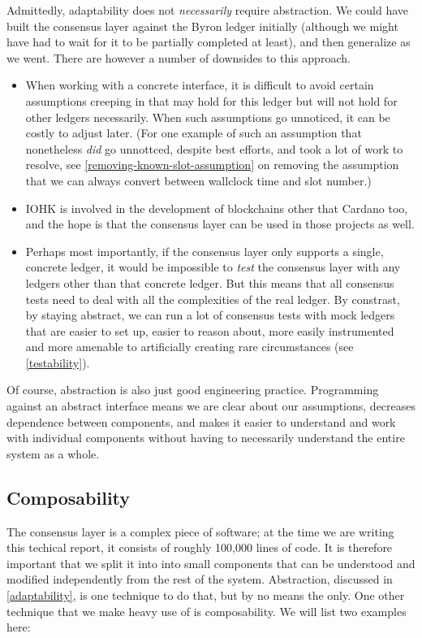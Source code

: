 Admittedly, adaptability does not \emph{necessarily} require abstraction. We
could have built the consensus layer against the Byron ledger initially
(although we might have had to wait for it to be partially completed at least),
and then generalize as we went. There are however a number of downsides to this
approach.

\begin{itemize}
\item When working with a concrete interface, it is difficult to avoid certain
assumptions creeping in that may hold for this ledger but will not hold for
other ledgers necessarily. When such assumptions go unnoticed, it can be costly
to adjust later. (For one example of such an assumption that nonetheless
\emph{did} go unnottced, despite best efforts, and took a lot of work to
resolve, see \cref{removing-known-slot-assumption} on removing the assumption
that we can always convert between wallclock time and slot number.)

\item IOHK is involved in the development of blockchains other that Cardano too,
and the hope is that the consensus layer can be used in those projects as well.

\item Perhaps most importantly, if the consensus layer only supports a single,
concrete ledger, it would be impossible to \emph{test} the consensus layer with
any ledgers other than that concrete ledger. But this means that all consensus
tests need to deal with all the complexities of the real ledger. By constrast,
by staying abstract, we can run a lot of consensus tests with mock ledgers that
are easier to set up, easier to reason about, more easily instrumented and more
amenable to artificially creating rare circumstances (see \cref{testability}).
\end{itemize}

Of course, abstraction is also just good engineering practice. Programming
against an abstract interface means we are clear about our assumptions,
decreases dependence between components, and makes it easier to understand and
work with individual components without having to necessarily understand the
entire system as a whole.

\subsection{Composability}
\label{composability}

The consensus layer is a complex piece of software;  at the time we are writing
this techical report, it consists of roughly 100,000 lines of code. It is
therefore important that we split it into into small components that can be
understood and modified independently from the rest of the system. Abstraction,
discussed in \cref{adaptability}, is one technique to do that, but by no means
the only. One other technique that we make heavy use of is composability. We
will list two examples here:

